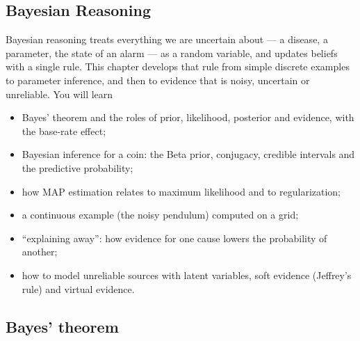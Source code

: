 \begin{notechapter}
\chapter{Bayesian Reasoning}\label{ch:bayesian-reasoning}

\begin{chapterintro}
Bayesian reasoning treats everything we are uncertain about --- a disease, a
parameter, the state of an alarm --- as a random variable, and updates beliefs
with a single rule. This chapter develops that rule from simple discrete
examples to parameter inference, and then to evidence that is noisy, uncertain
or unreliable. You will learn
\begin{itemize}[nosep]
  \item Bayes' theorem and the roles of prior, likelihood, posterior and
        evidence, with the base-rate effect;
  \item Bayesian inference for a coin: the Beta prior, conjugacy, credible
        intervals and the predictive probability;
  \item how MAP estimation relates to maximum likelihood and to
        regularization;
  \item a continuous example (the noisy pendulum) computed on a grid;
  \item ``explaining away'': how evidence for one cause lowers the probability of
        another;
  \item how to model unreliable sources with latent variables, soft evidence
        (Jeffrey's rule) and virtual evidence.
\end{itemize}
\end{chapterintro}

\section{Bayes' theorem}\label{bayesian-reasoning:sec:theorem}


\end{notechapter}
